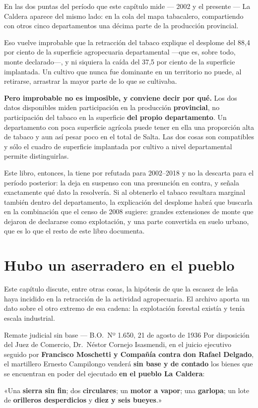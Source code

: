\begin{cautela}
En las dos puntas del período que este capítulo mide --- 2002 y el presente --- La Caldera aparece del mismo lado: en la cola del mapa tabacalero, compartiendo con otros cinco departamentos una décima parte de la producción provincial.

Eso vuelve improbable que la retracción del tabaco explique el desplome del 88,4 por ciento de la superficie agropecuaria departamental ---que es, sobre todo, monte declarado---, y ni siquiera la caída del 37,5 por ciento de la superficie implantada. Un cultivo que nunca fue dominante en un territorio no puede, al retirarse, arrastrar la mayor parte de lo que se cultivaba.

\textbf{Pero improbable no es imposible, y conviene decir por qué.} Los dos datos disponibles miden participación en la producción \textbf{provincial}, no participación del tabaco en la superficie \textbf{del propio departamento}. Un departamento con poca superficie agrícola puede tener en ella una proporción alta de tabaco y aun así pesar poco en el total de Salta. Las dos cosas son compatibles y sólo el cuadro de superficie implantada por cultivo a nivel departamental permite distinguirlas.

Este libro, entonces, la tiene por refutada para 2002--2018 y no la descarta para el período posterior: la deja en suspenso con una presunción en contra, y señala exactamente qué dato la resolvería. Si al obtenerlo el tabaco resultara marginal también dentro del departamento, la explicación del desplome habrá que buscarla en la combinación que el censo de 2008 sugiere: grandes extensiones de monte que dejaron de declararse como explotación, y una parte convertida en suelo urbano, que es lo que el resto de este libro documenta.
\end{cautela}

\section{Hubo un aserradero en el pueblo}

Este capítulo discute, entre otras cosas, la hipótesis de que la escasez de leña haya
incidido en la retracción de la actividad agropecuaria. El archivo aporta un dato sobre el
otro extremo de esa cadena: la explotación forestal existía y tenía escala industrial.

\begin{ficha}{Remate judicial sin base --- B.O.\ Nº 1.650, 21 de agosto de 1936}
Por disposición del Juez de Comercio, Dr.\ Néstor Cornejo Isasmendi, en el juicio ejecutivo
seguido por \textbf{Francisco Moschetti y Compañía contra don Rafael Delgado}, el martillero
Ernesto Campilongo venderá \textbf{sin base y de contado} los bienes que se encuentran en
poder del ejecutado \textbf{en el pueblo La Caldera}:

«Una \textbf{sierra sin fin}; dos \textbf{circulares}; un \textbf{motor a vapor}; una
\textbf{garlopa}; un lote de \textbf{orilleros desperdicios} y \textbf{diez y seis bueyes}.»
\end{ficha}

